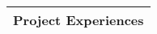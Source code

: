 \Large
\begin{tabularx}{\linewidth}{@{}l}
    Project Experiences \\
    \hline
\end{tabularx}
\normalsize